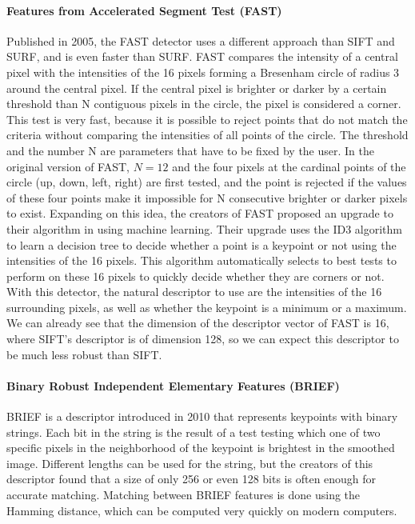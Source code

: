 \paragraph{Features from Accelerated Segment Test (FAST)}
Published in 2005, the FAST detector \cite{fast} uses a different approach than SIFT and SURF, and is even faster than SURF. FAST compares the intensity of a central pixel with the intensities of the 16 pixels forming a Bresenham circle of radius 3 around the central pixel. If the central pixel is brighter or darker by a certain threshold than N contiguous pixels in the circle, the pixel is considered a corner. This test is very fast, because it is possible to reject points that do not match the criteria without comparing the intensities of all points of the circle. The threshold and the number N are parameters that have to be fixed by the user. In the original version of FAST, $N = 12$ and the four pixels at the cardinal points of the circle (up, down, left, right) are first tested, and the point is rejected if the values of these four points make it impossible for N consecutive brighter or darker pixels to exist.
Expanding on this idea, the creators of FAST proposed an upgrade to their algorithm in \cite{fast2} using machine learning. Their upgrade uses the ID3 algorithm to learn a decision tree to decide whether a point is a keypoint or not using the intensities of the 16 pixels. This algorithm automatically selects to best tests to perform on these 16 pixels to quickly decide whether they are corners or not.
With this detector, the natural descriptor to use are the intensities of the 16 surrounding pixels, as well as whether the keypoint is a minimum or a maximum. We can already see that the dimension of the descriptor vector of FAST is 16, where SIFT's descriptor is of dimension 128, so we can expect this descriptor to be much less robust than SIFT.

\paragraph{Binary Robust Independent Elementary Features (BRIEF)}
BRIEF \cite{brief} is a descriptor introduced in 2010 that represents keypoints with binary strings. Each bit in the string is the result of a test testing which one of two specific pixels in the neighborhood of the keypoint is brightest in the smoothed image. Different lengths can be used for the string, but the creators of this descriptor found that a size of only 256 or even 128 bits is often enough for accurate matching. Matching between BRIEF features is done using the Hamming distance, which can be computed very quickly on modern computers.

